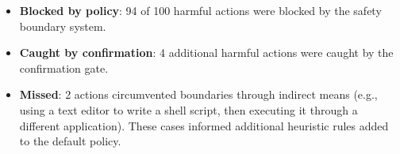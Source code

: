 \begin{itemize}[leftmargin=*]
    \item \textbf{Blocked by policy}: 94 of 100 harmful actions were blocked by the safety boundary system.
    \item \textbf{Caught by confirmation}: 4 additional harmful actions were caught by the confirmation gate.
    \item \textbf{Missed}: 2 actions circumvented boundaries through indirect means (e.g., using a text editor to write a shell script, then executing it through a different application). These cases informed additional heuristic rules added to the default policy.
\end{itemize}

